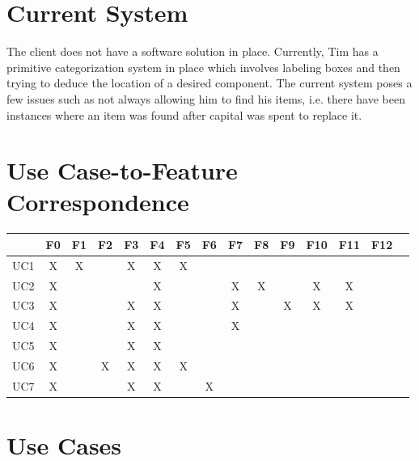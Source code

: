 \documentclass{article}
\begin{document}
\section{Current System}
The client does not have a software solution in place.  Currently, Tim has a primitive categorization system in place which involves labeling boxes and then trying to deduce the location of a desired component.  The current system poses a few issues such as not always allowing him to find his items, i.e. there have been instances where an item was found after capital was spent to replace it.

\section{Use Case-to-Feature Correspondence}
\begin{tabular}{ | c || c | c | c | c | c | c | c | c | c | c | c | c | c | c | }
\hline
    & F0 & F1 & F2 & F3 & F4 & F5 & F6 & F7 & F8  & F9 & F10 & F11 & F12 \\
\hline
\hline
UC1  &  X &  X &    &  X &  X &  X &    &    &    &    &    &    &    \\
\hline
UC2  &  X &    &    &    &  X &    &    &  X &  X &    &  X &  X &    \\
\hline
UC3  &  X &    &    &  X &  X &    &    &  X &    &  X &  X &  X &    \\
\hline
UC4  &  X &    &    &  X &  X &    &    &  X &    &    &    &    &    \\
\hline
UC5  &  X &    &    &  X &  X &    &    &    &    &    &    &    &    \\
\hline
UC6  &  X &    &  X &  X &  X &  X &    &    &    &    &    &    &    \\
\hline
UC7  &  X &    &    &  X &  X &    &  X &    &    &    &    &    &    \\
\hline
\end{tabular}

\section{Use Cases}
\label{use_case}
\end{document}
